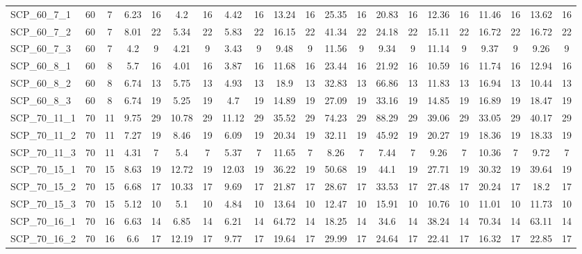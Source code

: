 \begin{sidewaystable}[!ht]
{\begin{tabular}{lcccccccccccccccccccc}
SCP\_60\_7\_1 & 60 & 7 & 6.23 & 16 &  \textcolor{blue2}{4.2} & 16 & 4.42 & 16 & 13.24 & 16 & 25.35 & 16 & 20.83 & 16 & 12.36 & 16 & 11.46 & 16 & 13.62 & 16 \\
SCP\_60\_7\_2 & 60 & 7 & 8.01 & 22 &  \textcolor{blue2}{5.34} & 22 & 5.83 & 22 & 16.15 & 22 & 41.34 & 22 & 24.18 & 22 & 15.11 & 22 & 16.72 & 22 & 16.72 & 22 \\
SCP\_60\_7\_3 & 60 & 7 & 4.2 & 9 & 4.21 & 9 &  \textcolor{blue2}{3.43} & 9 & 9.48 & 9 & 11.56 & 9 & 9.34 & 9 & 11.14 & 9 & 9.37 & 9 & 9.26 & 9 \\
SCP\_60\_8\_1 & 60 & 8 & 5.7 & 16 & 4.01 & 16 &  \textcolor{blue2}{3.87} & 16 & 11.68 & 16 & 23.44 & 16 & 21.92 & 16 & 10.59 & 16 & 11.74 & 16 & 12.94 & 16 \\
SCP\_60\_8\_2 & 60 & 8 & 6.74 & 13 & 5.75 & 13 &  \textcolor{blue2}{4.93} & 13 & 18.9 & 13 & 32.83 & 13 & 66.86 & 13 & 11.83 & 13 & 16.94 & 13 & 10.44 & 13 \\
SCP\_60\_8\_3 & 60 & 8 & 6.74 & 19 & 5.25 & 19 &  \textcolor{blue2}{4.7} & 19 & 14.89 & 19 & 27.09 & 19 & 33.16 & 19 & 14.85 & 19 & 16.89 & 19 & 18.47 & 19 \\
SCP\_70\_11\_1 & 70 & 11 &  \textcolor{blue2}{9.75} & 29 & 10.78 & 29 & 11.12 & 29 & 35.52 & 29 & 74.23 & 29 & 88.29 & 29 & 39.06 & 29 & 33.05 & 29 & 40.17 & 29 \\
SCP\_70\_11\_2 & 70 & 11 & 7.27 & 19 & 8.46 & 19 &  \textcolor{blue2}{6.09} & 19 & 20.34 & 19 & 32.11 & 19 & 45.92 & 19 & 20.27 & 19 & 18.36 & 19 & 18.33 & 19 \\
SCP\_70\_11\_3 & 70 & 11 &  \textcolor{blue2}{4.31} & 7 & 5.4 & 7 & 5.37 & 7 & 11.65 & 7 & 8.26 & 7 & 7.44 & 7 & 9.26 & 7 & 10.36 & 7 & 9.72 & 7 \\
SCP\_70\_15\_1 & 70 & 15 &  \textcolor{blue2}{8.63} & 19 & 12.72 & 19 & 12.03 & 19 & 36.22 & 19 & 50.68 & 19 & 44.1 & 19 & 27.71 & 19 & 30.32 & 19 & 39.64 & 19 \\
SCP\_70\_15\_2 & 70 & 15 &  \textcolor{blue2}{6.68} & 17 & 10.33 & 17 & 9.69 & 17 & 21.87 & 17 & 28.67 & 17 & 33.53 & 17 & 27.48 & 17 & 20.24 & 17 & 18.2 & 17 \\
SCP\_70\_15\_3 & 70 & 15 & 5.12 & 10 & 5.1 & 10 &  \textcolor{blue2}{4.84} & 10 & 13.64 & 10 & 12.47 & 10 & 15.91 & 10 & 10.76 & 10 & 11.01 & 10 & 11.73 & 10 \\
SCP\_70\_16\_1 & 70 & 16 & 6.63 & 14 & 6.85 & 14 &  \textcolor{blue2}{6.21} & 14 & 64.72 & 14 & 18.25 & 14 & 34.6 & 14 & 38.24 & 14 & 70.34 & 14 & 63.11 & 14 \\
SCP\_70\_16\_2 & 70 & 16 &  \textcolor{blue2}{6.6} & 17 & 12.19 & 17 & 9.77 & 17 & 19.64 & 17 & 29.99 & 17 & 24.64 & 17 & 22.41 & 17 & 16.32 & 17 & 22.85 & 17 \\

\end{tabular}}
\end{sidewaystable}
